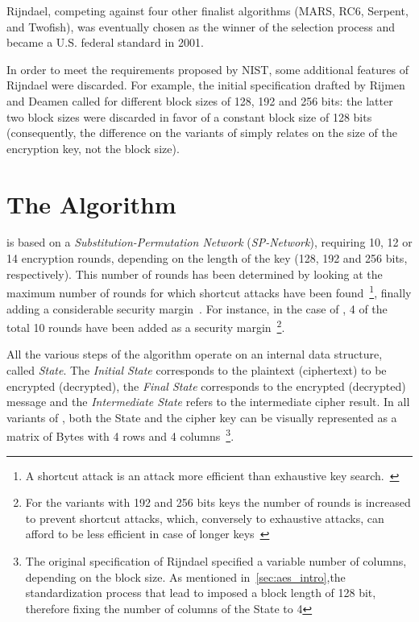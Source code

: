     Rijndael, competing against four other finalist algorithms (MARS, RC6, Serpent, and Twofish), was eventually chosen as the winner of the selection process and became a U.S. federal standard in 2001.

    In order to meet the requirements proposed by NIST, some additional features of Rijndael were discarded. For example, the initial specification drafted by Rijmen and Deamen called for different block sizes of 128, 192 and 256 bits: the latter two block sizes were discarded in favor of a constant block size of 128 bits (consequently, the difference on the variants of \aes{} simply relates on the size of the encryption key, not the block size).

\newpage
\section{The Algorithm}\label{sec:aes_design}
    \aes{} is based on a \emph{Substitution-Permutation Network} (\textit{SP-Network}), requiring 10, 12 or 14 encryption rounds, depending on the length of the key (128, 192 and 256 bits, respectively). This number of rounds has been determined by looking at the maximum number of rounds for which shortcut attacks have been found~\footnote{A shortcut attack is an attack more efficient than exhaustive key search.~\cite{daemen1999aes}}, finally adding a considerable security margin~\cite{daemen1999aes}. For instance, in the case of \aess{}, 4 of the total 10 rounds have been added as a security margin~\footnote{For the \aes{} variants with 192 and 256 bits keys the number of rounds is increased to prevent shortcut attacks, which, conversely to exhaustive attacks, can afford to be less efficient in case of longer keys~\cite{daemen1999aes}}.

    All the various steps of the algorithm operate on an internal data structure, called \emph{State}. The \emph{Initial State} corresponds to the plaintext (ciphertext) to be encrypted (decrypted), the \emph{Final State} corresponds to the encrypted (decrypted) message and the \emph{Intermediate State} refers to the intermediate cipher result. In all variants of \aes{}, both the State and the cipher key can be visually represented as a matrix of Bytes with 4 rows and 4 columns~\footnote{The original specification of Rijndael specified a variable number of columns, depending on the block size. As mentioned in~\ref{sec:aes_intro},the standardization process that lead to \aes{} imposed a block length of 128 bit, therefore fixing the number of columns of the State to 4}.

